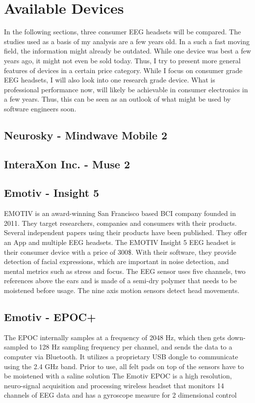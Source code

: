 \documentclass{llncs} %
\begin{document}
\section{Available Devices}
In the following sections, three consumer EEG headsets will be compared. The studies used as a basis of my analysis are a few years old. In a such a fast moving field, the information might already be outdated. While one device was best a few years ago, it might not even be sold today. Thus, I try to present more general features of devices in a certain price category. While I focus on consumer grade EEG headsets, I will also look into one research grade device. What is professional performance now, will likely be achievable in consumer electronics in a few years. Thus, this can be seen as an outlook of what might be used by software engineers soon.
\subsection{Neurosky - Mindwave Mobile 2}
\subsection{InteraXon Inc. - Muse 2}
\subsection{Emotiv - Insight 5}
EMOTIV is an award-winning San Francisco based BCI company founded in 2011. They target researchers, companies and consumers with their products. Several independent papers using their products have been published. They offer an App and multiple EEG headsets. The EMOTIV Insight 5 EEG headset is their consumer device with a price of 300\$. With their software, they provide detection of facial expressions, which are important in noise detection, and mental metrics such as stress and focus. The EEG sensor uses five channels, two references above the ears and is made of a semi-dry polymer that needs to be moistened before usage. The nine axis motion sensors detect head movements. \cite{Emotiv1}


\subsection{Emotiv - EPOC+}
The EPOC internally samples at a frequency of 2048 Hz, which then gets down-sampled to 128 Hz sampling frequency per channel, and sends the data to a computer via Bluetooth. It utilizes a proprietary USB dongle to communicate using the 2.4 GHz band. Prior to use, all felt pads on top of the sensors have to be moistened with a saline solution \cite{Kushaba}
The Emotiv EPOC is a high resolution, neuro-signal acquisition and processing wireless headset that monitors 14 channels of EEG data and has a gyroscope measure for 2 dimensional control
\end{document}
